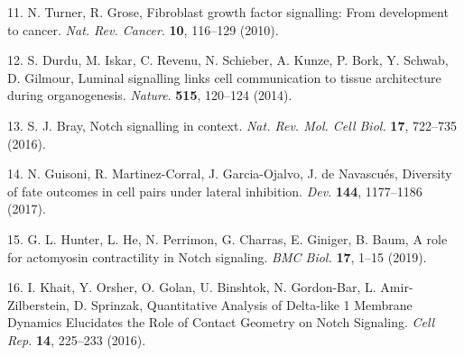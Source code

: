 \documentclass[11pt,singlespacinge,twoside]{reedthesis} %
\begin{document}
\leavevmode\hypertarget{ref-Turner2010}{}%
11. N. Turner, R. Grose, Fibroblast growth factor signalling: From development to cancer. \emph{Nat. Rev. Cancer}. \textbf{10}, 116--129 (2010).

\leavevmode\hypertarget{ref-Durdu2014a}{}%
12. S. Durdu, M. Iskar, C. Revenu, N. Schieber, A. Kunze, P. Bork, Y. Schwab, D. Gilmour, Luminal signalling links cell communication to tissue architecture during organogenesis. \emph{Nature}. \textbf{515}, 120--124 (2014).

\leavevmode\hypertarget{ref-Bray2016}{}%
13. S. J. Bray, Notch signalling in context. \emph{Nat. Rev. Mol. Cell Biol.} \textbf{17}, 722--735 (2016).

\leavevmode\hypertarget{ref-Guisoni2017}{}%
14. N. Guisoni, R. Martinez-Corral, J. Garcia-Ojalvo, J. de Navascués, Diversity of fate outcomes in cell pairs under lateral inhibition. \emph{Dev.} \textbf{144}, 1177--1186 (2017).

\leavevmode\hypertarget{ref-Hunter2019}{}%
15. G. L. Hunter, L. He, N. Perrimon, G. Charras, E. Giniger, B. Baum, A role for actomyosin contractility in Notch signaling. \emph{BMC Biol.} \textbf{17}, 1--15 (2019).

\leavevmode\hypertarget{ref-Khait2016}{}%
16. I. Khait, Y. Orsher, O. Golan, U. Binshtok, N. Gordon-Bar, L. Amir-Zilberstein, D. Sprinzak, Quantitative Analysis of Delta-like 1 Membrane Dynamics Elucidates the Role of Contact Geometry on Notch Signaling. \emph{Cell Rep.} \textbf{14}, 225--233 (2016).
\end{document}

